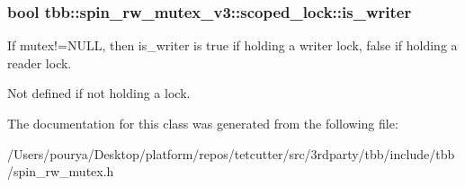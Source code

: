 \subsubsection[{is\+\_\+writer}]{\setlength{\rightskip}{0pt plus 5cm}bool tbb\+::spin\+\_\+rw\+\_\+mutex\+\_\+v3\+::scoped\+\_\+lock\+::is\+\_\+writer\hspace{0.3cm}{\ttfamily [protected]}}\label{classtbb_1_1spin__rw__mutex__v3_1_1scoped__lock_acfd129dc5106ad1129ba803e67311050}


If mutex!=N\+U\+L\+L, then is\+\_\+writer is true if holding a writer lock, false if holding a reader lock. 

Not defined if not holding a lock. 

The documentation for this class was generated from the following file\+:\begin{DoxyCompactItemize}
\item 
/\+Users/pourya/\+Desktop/platform/repos/tetcutter/src/3rdparty/tbb/include/tbb/spin\+\_\+rw\+\_\+mutex.\+h\end{DoxyCompactItemize}
